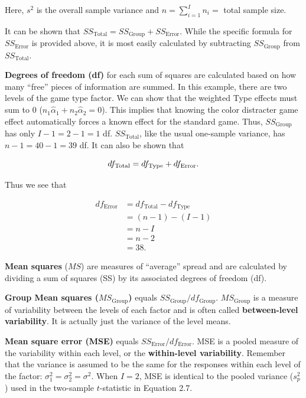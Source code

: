 \documentclass[
]{report}
\begin{document}
Here, \(\scriptstyle s^2\) is the overall sample variance and \(\scriptstyle n = \sum_{i=1}^{I} n_i =\) total sample size.

It can be shown that \(\scriptstyle SS_{\text{Total}} = SS_{\text{Group}} + SS_{\text{Error}}\). While the specific formula for \(\scriptstyle SS_{\text{Error}}\) is provided above, it is most easily calculated by subtracting \(\scriptstyle SS_{\text{Group}}\) from \(\scriptstyle SS_{\text{Total}}\).

\textbf{Degrees of freedom (df)} for each sum of squares are calculated based on how many ``free'' pieces of information are summed. In this example, there are two levels of the game type factor. We can show that the weighted Type effects must sum to 0 (\(\scriptstyle n_1 \hat{\alpha}_1 + n_2 \hat{\alpha}_2 = 0\)). This implies that knowing the color distracter game effect automatically forces a known effect for the standard game. Thus, \(\scriptstyle SS_{\text{Group}}\) has only \(\scriptstyle I - 1 = 2 - 1 = 1\) df. \(\scriptstyle SS_{\text{Total}}\), like the usual one-sample variance, has \(\scriptstyle n - 1 = 40 - 1 = 39\) df. It can also be shown that

\begin{equation}
df_{\text{Total}} = df_{\text{Type}} + df_{\text{Error}}.
\notag
\end{equation}

Thus we see that

\begin{align*}
df_{\text{Error}} 
&= df_{\text{Total}} - df_{\text{Type}} \\
&= (n - 1) - (I - 1) \\
&= n - I \\
&= n - 2 \\
&= 38.
\end{align*}

\textbf{Mean squares} (\(\scriptstyle MS\)) are measures of ``average'' spread and are calculated by dividing a sum of squares
(SS) by its associated degrees of freedom (df).

\textbf{Group Mean squares (\(\scriptstyle MS_{\text{Group}}\))} equals \(\scriptstyle SS_{\text{Group}}/df_{\text{Group}}\). \(\scriptstyle MS_{\text{Group}}\) is a measure of variability between the levels of each factor and is often called \textbf{between-level variability}. It is actually just the variance of the level means.

\textbf{Mean square error (MSE)} equals \(\scriptstyle SS_{\text{Error}}/df_{\text{Error}}\). MSE is a pooled measure of the variability within each level, or the \textbf{within-level variability}. Remember that the variance is assumed to be the same for the responses within each level of the factor: \(\scriptstyle \sigma_1^2 = \sigma_2^2 = \sigma^2\). When \(\scriptstyle I = 2\), MSE is identical to the pooled variance (\(\scriptstyle s_p^2\)) used in the two-sample \(\scriptstyle t\)-statistic in Equation 2.7.
\end{document}
